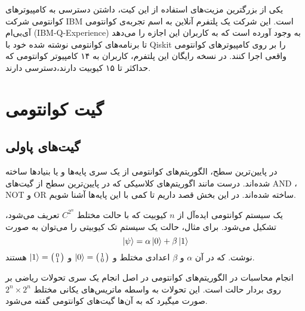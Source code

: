 \documentclass[a4paper,11pt,oneside,openany]{iut-thesis}
\begin{document}
یکی از بزرگترین مزیت‌های استفاده از این کیت،‌ داشتن دسترسی به کامپیوترهای کوانتومی  شرکت IBM است. این شرکت یک پلتفرم آنلاین به اسم تجربه‌ی کوانتومی آی‌بی‌ام (IBM-Q-Experience) به وجود آورده است که به کاربران این اجازه را می‌دهد تا برنامه‌های کوانتومی نوشته شده خود با Qiskit را بر روی کامپیوتر‌های کوانتومی واقعی اجرا کنند. در نسخه رایگان این پلتفرم، کاربران به ۱۴ کامپیوتر کوانتومی که حداکثر تا ۱۵ کیوبیت دارند،‌دسترسی دارند.


\section{
گیت کوانتومی
}
\subsection{
گیت‌های پاولی
}
در پایین‌ترین سطح، الگوریتم‌های کوانتومی از یک سری پایه‌ها و یا بنیادها ساخته شده‌اند. درست مانند اگوریتم‌های کلاسیکی که در پایین‌ترین سطح از گیت‌های AND ، NOT و OR  ساخته شده‌اند. در این بخش قصد داریم تا کمی با این پایه‌ها آشنا شویم. 

یک سیستم کوانتومی ایده‌آل از $n$ کیوبیت که با حالت مختلط $C^{2^n}$ تعریف می‌شود، تشکیل می‌شود. برای مثال،‌ حالت یک سیستم تک کیوبیتی را می‌توان به صورت
\begin{equation}
\ket \psi = \alpha \ket 0 + \beta \ket 1
\end{equation}
نوشت. که در آن $\alpha $ و $\beta $ اعدادی مختلط و $ \ket 0 =\bigl( \begin{smallmatrix} 1 \\ 0 \end{smallmatrix}\bigr) $ و  $ \ket 1 =\bigl( \begin{smallmatrix} 0 \\ 1 \end{smallmatrix}\bigr) $ هستند.

انجام محاسبات در الگوریتم‌های کوانتومی در اصل انجام یک سری تحولات ریاضی بر روی بردار حالت است. این تحولات به واسطه ماتریس‌های یکانی مختلط  $ 2^n \times 2^n $ صورت میگیرد که به آن‌ها گیت‌های کوانتومی گفته می‌شود.
\end{document}
